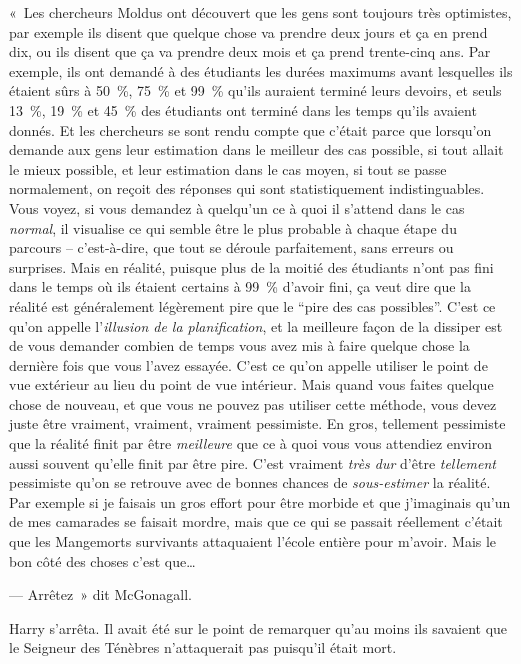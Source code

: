 «~Les chercheurs Moldus ont découvert que les gens sont toujours très optimistes, par exemple ils disent que quelque chose va prendre deux jours et ça en prend dix, ou ils disent que ça va prendre deux mois et ça prend trente-cinq ans. Par exemple, ils ont demandé à des étudiants les durées maximums avant lesquelles ils étaient sûrs à 50~\%, 75~\% et 99~\% qu'ils auraient terminé leurs devoirs, et seuls 13~\%, 19~\% et 45~\% des étudiants ont terminé dans les temps qu'ils avaient donnés. Et les chercheurs se sont rendu compte que c'était parce que lorsqu'on demande aux gens leur estimation dans le meilleur des cas possible, si tout allait le mieux possible, et leur estimation dans le cas moyen, si tout se passe normalement, on reçoit des réponses qui sont statistiquement indistinguables. Vous voyez, si vous demandez à quelqu'un ce à quoi il s'attend dans le cas \emph{normal}, il visualise ce qui semble être le plus probable à chaque étape du parcours -- c'est-à-dire, que tout se déroule parfaitement, sans erreurs ou surprises. Mais en réalité, puisque plus de la moitié des étudiants n'ont pas fini dans le temps où ils étaient certains à 99~\% d'avoir fini, ça veut dire que la réalité est généralement légèrement pire que le “pire des cas possibles”. C'est ce qu'on appelle l'\emph{illusion de la planification}, et la meilleure façon de la dissiper est de vous demander combien de temps vous avez mis à faire quelque chose la dernière fois que vous l'avez essayée. C'est ce qu'on appelle utiliser le point de vue extérieur au lieu du point de vue intérieur. Mais quand vous faites quelque chose de nouveau, et que vous ne pouvez pas utiliser cette méthode, vous devez juste être vraiment, vraiment, vraiment pessimiste. En gros, tellement pessimiste que la réalité finit par être \emph{meilleure} que ce à quoi vous vous attendiez environ aussi souvent qu'elle finit par être pire. C'est vraiment \emph{très dur} d'être \emph{tellement} pessimiste qu'on se retrouve avec de bonnes chances de \emph{sous-estimer} la réalité. Par exemple si je faisais un gros effort pour être morbide et que j'imaginais qu'un de mes camarades se faisait mordre, mais que ce qui se passait réellement c'était que les Mangemorts survivants attaquaient l'école entière pour m'avoir. Mais le bon côté des choses c'est que…

--- Arrêtez~» dit McGonagall.

Harry s'arrêta. Il avait été sur le point de remarquer qu'au moins ils savaient que le Seigneur des Ténèbres n'attaquerait pas puisqu'il était mort.

